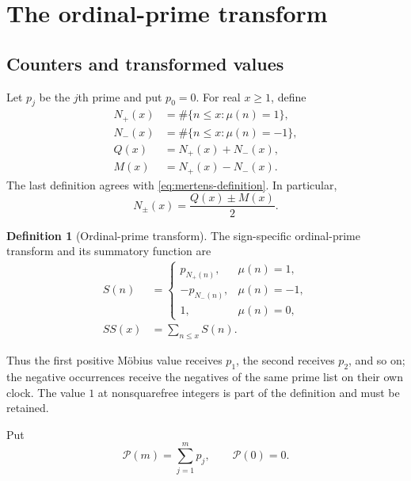 \documentclass[11pt]{amsart}
\numberwithin{equation}{section}
\theoremstyle{plain}
\theoremstyle{definition}
\newtheorem{definition}[theorem]{Definition}
\theoremstyle{remark}
\newcommand{\calP}{\mathcal P}
\begin{document}
\section{The ordinal-prime transform}
\label{sec:ordinal-transform}

\subsection{Counters and transformed values}
\label{subsec:counters-transform}

Let $p_j$ be the $j$th prime and put $p_0=0$.  For real $x\ge1$, define
\begin{align}
N_+(x)&=\#\{n\le x:\mu(n)=1\},
\label{eq:Nplus-definition}\\
N_-(x)&=\#\{n\le x:\mu(n)=-1\},
\label{eq:Nminus-definition}\\
Q(x)&=N_+(x)+N_-(x),
\label{eq:Q-definition}\\
M(x)&=N_+(x)-N_-(x).
\label{eq:M-counter-identity}
\end{align}
The last definition agrees with \eqref{eq:mertens-definition}.  In
particular,
\begin{equation}
N_\pm(x)=\frac{Q(x)\pm M(x)}2.
\label{eq:counters-QM}
\end{equation}

\begin{definition}[Ordinal-prime transform]
\label{def:S-transform}
The sign-specific ordinal-prime transform and its summatory function are
\begin{align}
S(n)&=
\begin{cases}
p_{N_+(n)},&\mu(n)=1,\\
-p_{N_-(n)},&\mu(n)=-1,\\
1,&\mu(n)=0,
\end{cases}
\label{eq:S-definition}\\
SS(x)&=\sum_{n\le x}S(n).
\label{eq:SS-definition}
\end{align}
\end{definition}

Thus the first positive M\"obius value receives $p_1$, the second receives
$p_2$, and so on; the negative occurrences receive the negatives of the same
prime list on their own clock.  The value $1$ at nonsquarefree integers is part
of the definition and must be retained.

Put
\begin{equation}
\calP(m)=\sum_{j=1}^{m}p_j,
\qquad \calP(0)=0.
\label{eq:prime-prefix-definition}
\end{equation}
\end{document}
